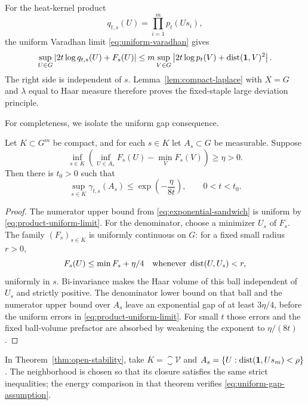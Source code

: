 For the heat-kernel product
\[
 q_{t,s}(U)=\prod_{i=1}^m p_t(Us_i),
\]
the uniform Varadhan limit \eqref{eq:uniform-varadhan} gives
\begin{equation}\label{eq:product-uniform-limit}
 \sup_{U\in G}\left|2t\log q_{t,s}(U)+F_s(U)\right|
 \leq m\sup_{V\in G}
 \left|2t\log p_t(V)+\operatorname{dist}(\mathbf 1,V)^2\right|.
\end{equation}
The right side is independent of $s$.  Lemma~\ref{lem:compact-laplace} with
$X=G$ and $\lambda$ equal to Haar measure therefore proves the fixed-staple
large deviation principle.

For completeness, we isolate the uniform gap consequence.

\begin{lemma}
\label{lem:uniform-gap}
Let $K\subset G^m$ be compact, and for each $s\in K$ let $A_s\subset G$ be
measurable.  Suppose
\begin{equation}\label{eq:uniform-gap-assumption}
 \inf_{s\in K}\left(\inf_{U\in A_s}F_s(U)-\min_VF_s(V)\right)\geq\eta>0.
\end{equation}
Then there is $t_0>0$ such that
\begin{equation}\label{eq:uniform-gap-result}
 \sup_{s\in K}\gamma_{t,s}(A_s)
 \leq\exp\left(-\frac{\eta}{8t}\right),
 \qquad 0<t<t_0.
\end{equation}
\end{lemma}

\begin{proof}
The numerator upper bound from \eqref{eq:exponential-sandwich} is uniform by
\eqref{eq:product-uniform-limit}.  For the denominator, choose a minimizer
$U_s$ of $F_s$.  The family $(F_s)_{s\in K}$ is uniformly continuous on
$G$: for a fixed small radius $r>0$,
\[
  F_s(U)\leq\min F_s+\eta/4
  \quad\text{whenever }\operatorname{dist}(U,U_s)<r,
\]
uniformly in $s$.  Bi-invariance makes the Haar volume of this ball
independent of $U_s$ and strictly positive.  The denominator lower bound on
that ball and the numerator upper bound over $A_s$ leave an exponential gap
of at least $3\eta/4$, before the uniform errors in
\eqref{eq:product-uniform-limit}.  For small $t$ those errors and the fixed
ball-volume prefactor are absorbed by weakening the exponent to
$\eta/(8t)$.
\end{proof}

In Theorem~\ref{thm:open-stability}, take $K=\closure{\mathcal V}$ and
$A_s=\{U:\operatorname{dist}(\mathbf 1,Us_m)<\rho\}$.  The neighborhood is chosen so that its
closure satisfies the same strict inequalities; the energy comparison in
that theorem verifies \eqref{eq:uniform-gap-assumption}.
